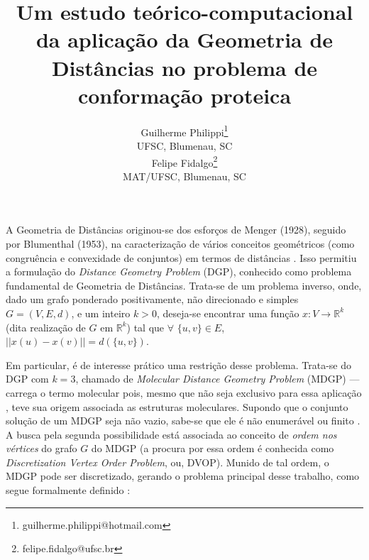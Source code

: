 \documentclass[a4,11pt]{pssbmac}
\begin{document}
	
	\title{Um estudo teórico-computacional da aplicação da Geometria de Distâncias no problema de conformação proteica}
	
	\author{
		{\large Guilherme Philippi}\thanks{guilherme.philippi@hotmail.com}\\
		{\small UFSC, Blumenau, SC} \\
		{\large Felipe Fidalgo}\thanks{felipe.fidalgo@ufsc.br} \\
		{\small MAT/UFSC, Blumenau, SC} \\
	}
	\criartitulo
	
	A Geometria de Distâncias originou-se dos esforços de Menger (1928), seguido por Blumenthal (1953), na caracterização de vários conceitos geométricos (como congruência e convexidade de conjuntos) em termos de distâncias \cite{carlileGDandAplications}. Isso permitiu a formulação do \textit{Distance Geometry Problem} (DGP), conhecido como problema fundamental de Geometria de Distâncias. Trata-se de um problema inverso, onde, dado um grafo ponderado positivamente, não direcionado e simples $G=(V,E, d)$, e um inteiro $k>0$, deseja-se encontrar uma função $x:V\rightarrow\mathbb{R}^k$ (dita realização de $G$ em $\mathbb{R}^k$) tal que $\forall$ $\{u,v\} \in E$, $||x(u) - x(v)|| = d(\{u,v\})$. 
	
	Em particular, é de interesse prático uma restrição desse problema. Trata-se do DGP com $k = 3$, chamado de \textit{Molecular Distance Geometry Problem} (MDGP) --- carrega o termo molecular pois, mesmo que não seja exclusivo para essa aplicação \cite{carlileGDandAplications}, teve sua origem associada as estruturas moleculares. Supondo que o conjunto solução de um MDGP seja não vazio, sabe-se que ele é não enumerável ou finito \cite{carlileBook31Coloquio}. A busca pela segunda possibilidade está associada ao conceito de \textit{ordem nos vértices} do grafo $G$ do MDGP (a procura por essa ordem é conhecida como \textit{Discretization Vertex Order Problem}, ou, DVOP). Munido de tal ordem, o MDGP pode ser discretizado, gerando o problema principal desse trabalho, como segue formalmente definido \cite{carlileBook31Coloquio} \cite{carlileDMDGP}:
	\\
	
\end{document}
